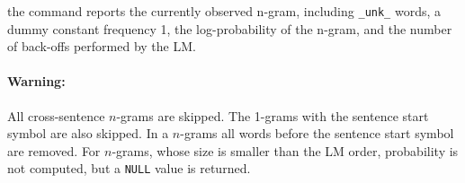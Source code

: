 \noindent
the command reports the currently observed n-gram, 
including {\tt\_unk\_} words, a dummy
constant frequency 1, the log-probability of the n-gram, and the 
number of back-offs performed by the LM.  

\paragraph{Warning:} All cross-sentence $n$-grams are skipped. The 1-grams with the sentence start symbol are also skipped. In a $n$-grams all words before the sentence start symbol are removed. For $n$-grams, whose size is smaller than the LM order, probability is not computed, but a {\tt NULL} value is returned.

